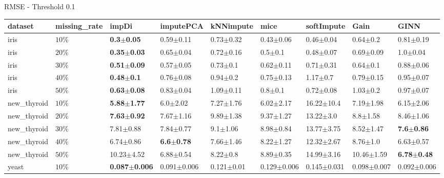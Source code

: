 

 RMSE - Threshold 0.1 
 \begin{tabular}{lllllllll}
\toprule
    dataset & missing_rate &                    impDi &             imputePCA &       kNNimpute &            mice &      softImpute &            Gain &                   GINN \\
\midrule
       iris &     $ 10\% $ &    \textbf{0.3$\pm$0.05} &         0.59$\pm$0.11 &   0.73$\pm$0.32 &   0.43$\pm$0.06 &   0.46$\pm$0.04 &    0.64$\pm$0.2 &          0.81$\pm$0.19 \\
       iris &     $ 20\% $ &   \textbf{0.35$\pm$0.03} &         0.65$\pm$0.04 &   0.72$\pm$0.16 &     0.5$\pm$0.1 &   0.48$\pm$0.07 &   0.69$\pm$0.09 &           1.0$\pm$0.04 \\
       iris &     $ 30\% $ &   \textbf{0.51$\pm$0.09} &         0.57$\pm$0.05 &    0.73$\pm$0.1 &   0.62$\pm$0.11 &   0.71$\pm$0.31 &    0.64$\pm$0.1 &          0.88$\pm$0.06 \\
       iris &     $ 40\% $ &    \textbf{0.48$\pm$0.1} &         0.76$\pm$0.08 &    0.94$\pm$0.2 &   0.75$\pm$0.13 &    1.17$\pm$0.7 &   0.79$\pm$0.15 &          0.95$\pm$0.07 \\
       iris &     $ 50\% $ &   \textbf{0.63$\pm$0.08} &         0.83$\pm$0.04 &   1.09$\pm$0.11 &     0.8$\pm$0.1 &   0.72$\pm$0.08 &    1.03$\pm$0.2 &          0.97$\pm$0.07 \\
new_thyroid &     $ 10\% $ &   \textbf{5.88$\pm$1.77} &          6.0$\pm$2.02 &   7.27$\pm$1.76 &   6.02$\pm$2.17 &  16.22$\pm$10.4 &   7.19$\pm$1.98 &          6.15$\pm$2.06 \\
new_thyroid &     $ 20\% $ &   \textbf{7.63$\pm$0.92} &         7.67$\pm$1.16 &   9.89$\pm$1.38 &   9.37$\pm$1.27 &   13.22$\pm$3.0 &    8.8$\pm$1.58 &          8.46$\pm$1.06 \\
new_thyroid &     $ 30\% $ &            7.81$\pm$0.88 &         7.84$\pm$0.77 &    9.1$\pm$1.06 &   8.98$\pm$0.84 &  13.77$\pm$3.75 &   8.52$\pm$1.47 &  \textbf{7.6$\pm$0.86} \\
new_thyroid &     $ 40\% $ &            6.74$\pm$0.86 & \textbf{6.6$\pm$0.78} &   7.66$\pm$1.46 &   8.22$\pm$1.27 &  12.32$\pm$2.67 &    8.76$\pm$1.0 &          6.63$\pm$0.57 \\
new_thyroid &     $ 50\% $ &           10.23$\pm$4.52 &         6.88$\pm$0.54 &    8.22$\pm$0.8 &   8.89$\pm$0.35 &  14.99$\pm$3.16 &  10.46$\pm$1.59 & \textbf{6.78$\pm$0.48} \\
      yeast &     $ 10\% $ & \textbf{0.087$\pm$0.006} &       0.091$\pm$0.006 &  0.121$\pm$0.01 & 0.129$\pm$0.006 & 0.145$\pm$0.031 & 0.098$\pm$0.007 &        0.092$\pm$0.006 \\

\end{tabular}
